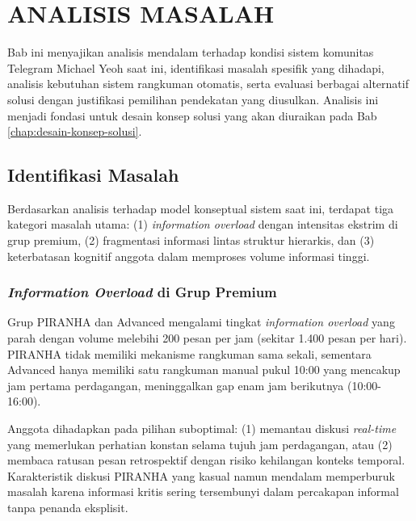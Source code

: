 \chapter{ANALISIS MASALAH}
\label{chap:analisis-masalah}

Bab ini menyajikan analisis mendalam terhadap kondisi sistem komunitas Telegram Michael Yeoh saat ini, identifikasi masalah spesifik yang dihadapi, analisis kebutuhan sistem rangkuman otomatis, serta evaluasi berbagai alternatif solusi dengan justifikasi pemilihan pendekatan yang diusulkan. Analisis ini menjadi fondasi untuk desain konsep solusi yang akan diuraikan pada Bab \ref{chap:desain-konsep-solusi}.


\section{Identifikasi Masalah}
\label{sec:identifikasi-masalah}

Berdasarkan analisis terhadap model konseptual sistem saat ini, terdapat tiga kategori masalah utama: (1) \textit{information overload} dengan intensitas ekstrim di grup premium, (2) fragmentasi informasi lintas struktur hierarkis, dan (3) keterbatasan kognitif anggota dalam memproses volume informasi tinggi.

\subsection{\textit{Information Overload} di Grup Premium}

Grup PIRANHA dan Advanced mengalami tingkat \textit{information overload} yang parah dengan volume melebihi 200 pesan per jam (sekitar 1.400 pesan per hari). PIRANHA tidak memiliki mekanisme rangkuman sama sekali, sementara Advanced hanya memiliki satu rangkuman manual pukul 10:00 yang mencakup jam pertama perdagangan, meninggalkan gap enam jam berikutnya (10:00-16:00).

Anggota dihadapkan pada pilihan suboptimal: (1) memantau diskusi \textit{real-time} yang memerlukan perhatian konstan selama tujuh jam perdagangan, atau (2) membaca ratusan pesan retrospektif dengan risiko kehilangan konteks temporal. Karakteristik diskusi PIRANHA yang kasual namun mendalam memperburuk masalah karena informasi kritis sering tersembunyi dalam percakapan informal tanpa penanda eksplisit.

